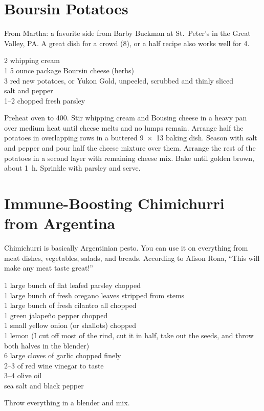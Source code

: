 \section{Boursin Potatoes}

\begin{open}
    From Martha: a favorite side from Barby Buckman at St.~Peter's in the Great
    Valley, PA. A great dish for a crowd (8), or a half recipe also works well
    for 4.
\end{open}
\begin{ingredients}
    \SI{2}{\cup} whipping cream\\
    1 \SI{5}{\ounce} ounce package Boursin cheese (herbs)\\
    \SI{3}{\pound} red new potatoes, or Yukon Gold, unpeeled, scrubbed and
    thinly sliced\\
    salt and pepper\\
    \SIrange{1}{2}{\tblspoon} chopped fresh parsley
\end{ingredients}
Preheat oven to \SI{400}{\degreeF}. Stir whipping cream and Bousing cheese in a
heavy pan over medium heat until cheese melts and no lumps remain. Arrange half
the potatoes in overlapping rows in a buttered \SI{9x13}{\inch} baking dish.
Season with salt and pepper and pour half the cheese mixture over them. Arrange
the rest of the potatoes in a second layer with remaining cheese mix. Bake until
golden brown, about \SI{1}{\hour}. Sprinkle with parsley and serve.

\section{Immune-Boosting Chimichurri from Argentina}

\begin{open}
    Chimichurri is basically Argentinian pesto.  You can use it on everything
    from meat dishes, vegetables, salads, and breads.  According to Alison Rona, ``This will make any meat taste great!''
\end{open}
\begin{ingredients}
    1 large bunch of flat leafed parsley chopped\\
    1 large bunch of fresh oregano leaves stripped from stems\\
    1 large bunch of fresh cilantro all chopped\\
    1 green jalape\~{n}o pepper chopped\\
    1 small yellow onion (or shallots) chopped\\
    1 lemon (I cut off most of the rind, cut it in half, take out the seeds, and
    throw both halves in the blender)\\
    6 large cloves of garlic chopped finely\\
    \SIrange{2}{3}{\tblspoon} of red wine vinegar to taste\\
    \SIrange{3}{4}{\tblspoon} olive oil\\
    sea salt and black pepper
\end{ingredients}
Throw everything in a blender and mix.